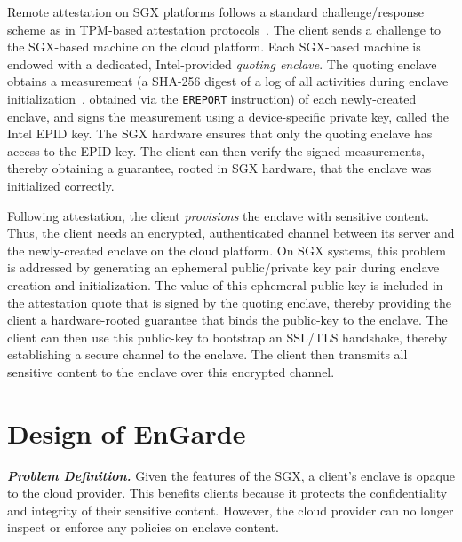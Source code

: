 \documentclass[conference,compsoc]{IEEEtran}
\newcommand{\myparagraphsquish}[1]{\noindent\textbf{\textit{#1}}}
\newcommand{\code}[1]{{\tt \footnotesize #1}}
\newcommand{\TOOL}{EnGarde\xspace} %
\begin{document}
Remote attestation on SGX platforms follows a standard challenge/response
scheme as in TPM-based attestation protocols~\cite{sailer:tpm:security04}. The
client sends a challenge to the SGX-based machine on the cloud platform.  Each
SGX-based machine is endowed with a dedicated, Intel-provided \textit{quoting
enclave}. The quoting enclave obtains a measurement (a SHA-256 digest of a log
of all activities during enclave initialization~\cite{sgx:attest:hasp13},
obtained via the \code{EREPORT} instruction) of each newly-created enclave, and
signs the measurement using a device-specific private key, called the Intel
EPID key. The SGX hardware ensures that only the quoting enclave has access to
the EPID key.  The client can then verify the signed measurements, thereby
obtaining a guarantee, rooted in SGX hardware, that the enclave was initialized
correctly.

Following attestation, the client \textit{provisions} the enclave with
sensitive content. Thus, the client needs an encrypted, authenticated channel
between its server and the newly-created enclave on the cloud platform. On SGX
systems, this problem is addressed by generating an ephemeral public/private
key pair during enclave creation and initialization. The value of this
ephemeral public key is included in the attestation quote that is signed by the
quoting enclave, thereby providing the client a hardware-rooted guarantee that
binds the public-key to the enclave.  The client can then use this public-key
to bootstrap an SSL/TLS handshake, thereby establishing a secure channel to the
enclave. The client then transmits all sensitive content to the enclave over
this encrypted channel.



% 

\section{Design of \TOOL}
\label{section:design}

\myparagraphsquish{Problem Definition.}
%
Given the features of the SGX, a client's enclave is opaque to the cloud
provider. This benefits clients because it protects the confidentiality and
integrity of their sensitive content. However, the cloud provider can no longer
inspect or enforce any policies on enclave content.
\end{document}
